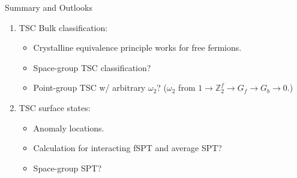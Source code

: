 \documentclass[xcolor=table, 11pt, aspectratio=169]{beamer}
\begin{document}
  \begin{frame}{Summary and Outlooks}
    \begin{enumerate}
      \item TSC Bulk classification:
      \begin{itemize}
        \item Crystalline equivalence principle works for free fermions.
        \item Space-group TSC classification?
        \item Point-group TSC w/ arbitrary $\omega_2$? ($\omega_2$ from $1\rightarrow \mathbb Z_2^f\rightarrow G_f\rightarrow G_b\rightarrow0$.)
      \end{itemize}
      \item TSC surface states:
      \begin{itemize}
        \item Anomaly locations.
        \item Calculation for interacting fSPT and average SPT?
        \item Space-group SPT?
      \end{itemize}
    \end{enumerate}
  \end{frame}
\end{document}
